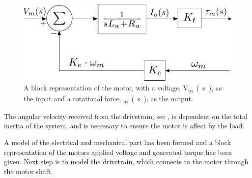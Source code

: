 \begin{figure}[H]
	\centering
	\includegraphics[scale=0.9]{figures/motormodelBlock.pdf}
	\caption{A block representation of the motor, with a voltage, \si{V_m(s)}, as the input and a rotational force, \si{\tau_m(s)}, as the output.}
	\label{fig:motormodelBlock}
\end{figure}

The angular velocity received from the drivetrain, see , is dependent on the total inertia of the system, and is necessary to ensure the motor is affect by the load.

A model of the electrical and mechanical part has been formed and a block representation of the motors applied voltage and generated torque has been given. Next step is to model the drivetrain, which connects to the motor through the motor shaft.